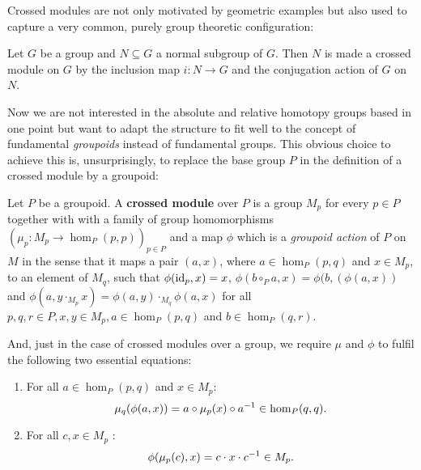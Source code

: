 Crossed modules are not only motivated by geometric examples but also used to
capture a very common, purely group theoretic configuration:

\begin{example}
Let $G$ be a group and $N \subseteq G$ a normal subgroup of $G$. Then $N$ is made a
crossed module on $G$ by the inclusion map $i : N \to G$ and the conjugation action
of $G$ on $N$.
\end{example}

Now we are not interested in the absolute and relative homotopy groups based in
one point but want to adapt the structure to fit well to the concept of fundamental
\emph{groupoids} instead of fundamental groups.
This obvious choice to achieve this is, unsurprisingly, to replace the base group $P$ in
the definition of a crossed module by a groupoid:

\begin{defn} \label{def:xmod-gpd}
Let $P$ be a groupoid.
A \textbf{crossed module} over $P$ is a group $M_p$
for every $p \in P$ together with
with a family of group homomorphisms $(\mu_p : M_p \to \hom_P(p,p))_{p \in P}$
and a map $\phi$ which is a \emph{groupoid action} of $P$ on $M$ in the sense that
it maps a pair $(a,x)$, where $a \in \hom_P(p,q)$ and $x \in M_p$, to an element
of $M_q$, such that $\phi(\operatorname{id}_p,x) = x$, $\phi(b \circ_P a, x) = \phi(b,(\phi(a,x))$
and $\phi(a, y \cdot_{M_p} x) = \phi(a,y) \cdot_{M_q} \phi(a,x)$ for all
$p, q, r \in P, x,y \in M_p, a \in \hom_P(p,q)$ and $b \in \hom_P(q,r)$.

And, just in the case of crossed modules over a group, we require $\mu$ and $\phi$
to fulfil the following two essential equations:
\begin{enumerate}
\item For all $a \in \hom_P(p,q)$ and $x \in M_p$:
\begin{equation} \label{eq:gp-CM1}
\mu_q(\phi(a,x)) = a \circ \mu_p(x) \circ a^{-1} \in \hom_P(q,q) \text{.}
\end{equation}
\item For all $c, x \in M_p$ :
\begin{equation} \label{eq:gp-CM2}
\phi(\mu_p(c),x) = c \cdot x \cdot c^{-1} \in M_p \text{.}
\end{equation}
\end{enumerate}
\end{defn}


